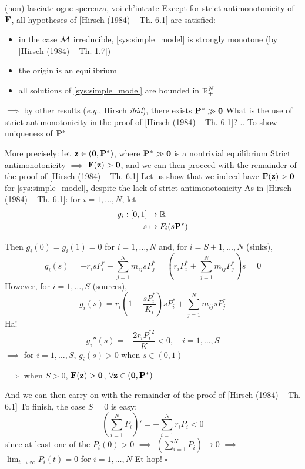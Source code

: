\documentclass[aspectratio=169]{beamer}
\begin{document}
\begin{frame}{(non) lasciate ogne sperenza, voi ch'intrate}
	Except for strict antimonotonicity of $\mathbf{F}$, all hypotheses of [Hirsch (1984) -- Th. 6.1] are satisfied:
	\begin{itemize}
		\item in the case $\mathcal{M}$ irreducible, \eqref{sys:simple_model} is strongly monotone (by [Hirsch (1984) -- Th. 1.7])
		\item the origin is an equilibrium
		\item all solutions of \eqref{sys:simple_model} are bounded in $\mathbb{R}_+^N$
	\end{itemize}
	\vfill
	$\implies$ by other results (\emph{e.g.}, Hirsch \emph{ibid}), there exists $\bP^*\gg \b0$
	\vfill
	What is the use of strict antimonotonicity in the proof of [Hirsch (1984) -- Th. 6.1]? .. To show uniqueness of $\mathbf{P}^*$
\end{frame}

\begin{frame}
		More precisely: let $\bz\in(\b0,\bP^*)$, where $\bP^*\gg\b0$ is a nontrivial equilibrium
		\vfill
		Strict antimonotonicity $\implies$ $\bF(\bz)>\b0$, and we can then proceed with the remainder of the proof of [Hirsch (1984) -- Th. 6.1]
		\vfill
		Let us show that we indeed have $\bF(\bz)>\b0$ for \eqref{sys:simple_model}, despite the lack of strict antimonotonicity
		\vfill
		As in [Hirsch (1984) -- Th. 6.1]: for $i = 1,\ldots,N$, let 
		\begin{align*}
		g_i :  [0,1] &\to\mathbb{R} \\
		s &\mapsto F_i(s\mathbf{P}^*)
		\end{align*}
\end{frame}

\begin{frame}
	Then $g_i(0)=g_i(1)=0$ for $i=1,\ldots,N$ and, for $i=S+1,\ldots,N$ 
	(sinks),
		\[
		g_i(s) = -r_isP_i^*+\sum_{j=1}^Nm_{ij}sP_j^*
		= \left(r_iP_i^*+\sum_{j=1}^Nm_{ij}P_j^*\right)s=0
		\]
		However, for $i=1,\ldots,S$ (sources),
		\[
		g_i(s) = r_i\left(1-\frac{sP_i^*}{K_i}\right)sP_i^*
		+\sum_{j=1}^Nm_{ij}sP_j^*
		\]
		Ha!
		\[
		g_i''(s)=-\frac{2r_iP_i^{*2}}{K}<0,\quad i=1,\ldots,S
		\]
		\vfill
		$\implies$ for $i=1,\ldots,S$, $g_i(s)>0$ when $s\in(0,1)$
		
		$\implies$ 
		when $S>0$, $\bF(\bz)>\b0$, $\forall\bz\in(\b0,\bP^*)$
		
\end{frame}
		
\begin{frame}
	And we can then carry on with the remainder of the proof of [Hirsch (1984) -- Th. 6.1]
	\vfill
	To finish, the case $S=0$ is easy: 
	\[
	\left(\sum_{i=1}^{N}{P_i}\right)' 
	= -\sum_{i=1}^N r_iP_i < 0
	\]
	since at least one of the $P_i(0)>0$ 
	\vfill 
	$\implies$ $\left(\sum_{i=1}^{N}{P_i}\right)\to 0$ $\implies$ $\lim_{t\to\infty}P_i(t)=0$ for $i=1,\ldots,N$
	\vfill
	Et hop! $\square$
\end{frame}
\end{document}
